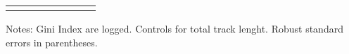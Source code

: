 \begin{table}[H]
{\begin{threeparttable}
\begin{tabular}{lccccccc}
\bottomrule[0.5pt]                                                                               \label{tab:table2}                                                                       \end{tabular}                                                                                                    \vspace{-13pt}                                                                                           \begin{tablenotes}[flushleft]{\setlength{\itemindent}{-3pt}}          \small                                                                                                           \item Notes: Gini Index are logged. Controls for total track lenght. Robust standard errors in parentheses.            \end{tablenotes}                                                                                         \end{threeparttable}                                                                             }                                                                                                                        \end{table}
